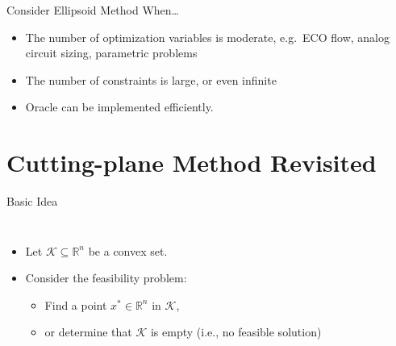 \documentclass[
  ignorenonframetext,
  aspectratio=169,
  serif,onlymath]{beamer}
\providecommand{\tightlist}{%
  \setlength{\itemsep}{0pt}\setlength{\parskip}{0pt}}
\begin{document}
\begin{frame}{Consider Ellipsoid Method When\ldots{}}
\protect\hypertarget{consider-ellipsoid-method-when}{}

\begin{itemize}
\item
  The number of optimization variables is moderate, e.g.~ECO flow,
  analog circuit sizing, parametric problems
\item
  The number of constraints is large, or even infinite
\item
  Oracle can be implemented efficiently.
\end{itemize}

\end{frame}

\hypertarget{cutting-plane-method-revisited}{%
\section{Cutting-plane Method
Revisited}\label{cutting-plane-method-revisited}}

\begin{frame}{Basic Idea}
\protect\hypertarget{basic-idea}{}

\begin{columns}

\begin{itemize}
\tightlist
\item
  Let \(\mathcal{K} \subseteq \mathbb{R}^n\) be a convex set.
\item
  Consider the feasibility problem:

  \begin{itemize}
  \tightlist
  \item
    Find a point \(x^* \in \mathbb{R}^n\) in \(\mathcal{K}\),
  \item
    or determine that \(\mathcal{K}\) is empty (i.e., no feasible
    solution)
  \end{itemize}
\end{itemize}



\end{columns}

\end{frame}
\end{document}
